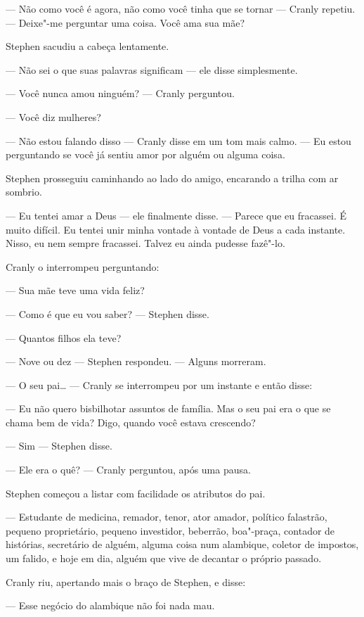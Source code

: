  --- Não como você é agora, não como você tinha que se tornar --- Cranly
repetiu. --- Deixe"-me perguntar uma coisa. Você ama sua mãe?

Stephen sacudiu a cabeça lentamente.

 --- Não sei o que suas palavras significam --- ele disse simplesmente.

 --- Você nunca amou ninguém? --- Cranly perguntou.

 --- Você diz mulheres?

 --- Não estou falando disso --- Cranly disse em um tom mais calmo. --- Eu estou
perguntando se você já sentiu amor por alguém ou alguma coisa.

Stephen prosseguiu caminhando ao lado do amigo, encarando a trilha com
ar sombrio.

 --- Eu tentei amar a Deus --- ele finalmente disse. --- Parece que eu fracassei.
É muito difícil. Eu tentei unir minha vontade à vontade de Deus a cada
instante. Nisso, eu nem sempre fracassei. Talvez eu ainda pudesse
fazê"-lo.

Cranly o interrompeu perguntando:

 --- Sua mãe teve uma vida feliz?

 --- Como é que eu vou saber? --- Stephen disse.

 --- Quantos filhos ela teve?

 --- Nove ou dez --- Stephen respondeu. --- Alguns morreram.

 --- O seu pai\ldots{} --- Cranly se interrompeu por um instante e então disse: 
 
 --- Eu não quero bisbilhotar assuntos de família. Mas o seu pai era o que se chama bem de vida?
Digo, quando você estava crescendo?

 --- Sim --- Stephen disse.

 --- Ele era o quê? --- Cranly perguntou, após uma pausa.

Stephen começou a listar com facilidade os atributos do pai.

 --- Estudante de medicina, remador, tenor, ator amador, político
falastrão, pequeno proprietário, pequeno investidor, beberrão,
boa"-praça, contador de histórias, secretário de alguém, alguma coisa
num alambique, coletor de impostos, um falido, e hoje em dia, alguém
que vive de decantar o próprio passado.

Cranly riu, apertando mais o braço de Stephen, e disse:

 --- Esse negócio do alambique não foi nada mau.

